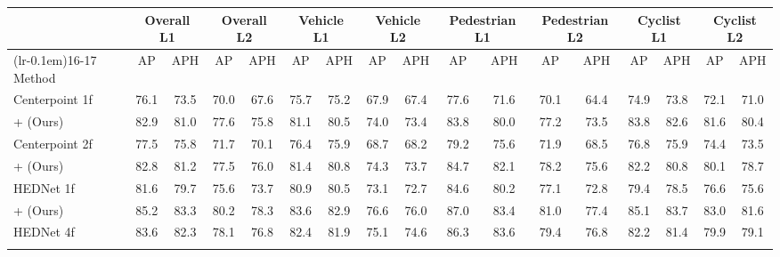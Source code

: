 \begin{table}[t]
    \setlength{\tabcolsep}{4pt}  %
    \centering
    \footnotesize
    \begin{tabular}{@{}lcccccccccccccccc@{}}
    \toprule
                            & \multicolumn{2}{c}{Overall L1} & \multicolumn{2}{c}{Overall L2} & \multicolumn{2}{c}{Vehicle L1} & \multicolumn{2}{c}{Vehicle L2} & \multicolumn{2}{c}{Pedestrian L1} & \multicolumn{2}{c}{Pedestrian L2} & \multicolumn{2}{c}{Cyclist L1} & \multicolumn{2}{c}{Cyclist L2} \\ 
                            \cmidrule(lr){2-3} \cmidrule(lr){4-5} \cmidrule(lr){6-7} \cmidrule(lr){8-9} \cmidrule(lr){10-11} \cmidrule(lr){12-13} \cmidrule(lr{5em}){13-14} \cmidrule(lr){14-15}  \cmidrule(lr{5em}){15-16} \cmidrule(lr{-0.1em}){16-17}
    Method                             & AP            & APH  & AP   & APH  & AP            & APH  & AP   & APH  & AP   & APH  & AP   & APH  & AP   & APH  & AP   & APH  \\ \midrule
    Centerpoint 1f~\cite{centerpoint}  & 76.1          & 73.5 & 70.0 & 67.6 & 75.7          & 75.2 & 67.9 & 67.4 & 77.6 & 71.6 & 70.1 & 64.4 & 74.9 & 73.8 & 72.1 & 71.0 \\
    \rowcolor{tablecolor}
    + \ourmodel{} (Ours)               & 82.9          & 81.0 &77.6 & 75.8 & 81.1 & 80.5 & 74.0 & 73.4 & 83.8 & 80.0 & 77.2 & 73.5 & 83.8 & 82.6 & 81.6 &80.4 \\ \midrule
    Centerpoint 2f~\cite{centerpoint}  & 77.5          & 75.8 & 71.7 & 70.1 & 76.4          & 75.9 & 68.7 & 68.2 & 79.2 & 75.6 & 71.9 & 68.5 & 76.8 & 75.9 & 74.4 & 73.5 \\
    \rowcolor{tablecolor}
    + \ourmodel{} (Ours)               & 82.8 & 81.2 & 77.5 & 76.0 & 81.4 & 80.8 & 74.3 & 73.7 & 84.7 & 82.1 & 78.2 & 75.6 & 82.2 & 80.8 & 80.1 & 78.7 \\ \midrule
    HEDNet 1f~\cite{hednet}            & 81.6          & 79.7 & 75.6 & 73.7 & 80.9          & 80.5 & 73.1 & 72.7 & 84.6 & 80.2 & 77.1 & 72.8 & 79.4 & 78.5 & 76.6 & 75.6 \\
    \rowcolor{tablecolor}
    + \ourmodel{} (Ours)               & 85.2 & 83.3 & 80.2 & 78.3 & 83.6 & 82.9 & 76.6 & 76.0 & 87.0 & 83.4 & 81.0 & 77.4 & 85.1 & 83.7 & 83.0 & 81.6 \\ \midrule
    HEDNet 4f~\cite{hednet}            & 83.6          & 82.3 & 78.1 & 76.8 & 82.4          & 81.9 & 75.1 & 74.6 & 86.3 & 83.6 & 79.4 & 76.8 & 82.2 & 81.4 & 79.9 & 79.1 \\
    \rowcolor{tablecolor}

\end{tabular}
\end{table}
